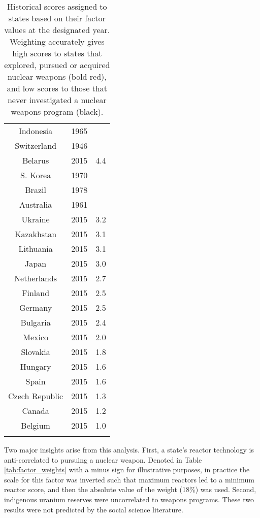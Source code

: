 \begin{table}
\begin{minipage}{.5\textwidth}
\begin{tabular}{|c|c|c|}
Indonesia & 1965 & \textbf{\color{red}{4.4}} \\
Switzerland & 1946 & \textbf{\color{red}{4.4}} \\
Belarus & 2015 & 4.4 \\
S. Korea & 1970 & \textbf{\color{red}{4.4}} \\
Brazil & 1978 & \textbf{\color{red}{4.3}} \\
Australia & 1961 & \textbf{\color{red}{3.9}} \\
Ukraine & 2015 & 3.2 \\
Kazakhstan & 2015 & 3.1 \\
Lithuania & 2015 & 3.1 \\
Japan & 2015 & 3.0 \\
Netherlands & 2015 & 2.7 \\
Finland & 2015 & 2.5 \\
Germany & 2015 & 2.5 \\
Bulgaria & 2015 & 2.4 \\
Mexico & 2015 & 2.0 \\
Slovakia & 2015 & 1.8 \\
Hungary & 2015 & 1.6 \\
Spain & 2015 & 1.6 \\
Czech Republic & 2015 & 1.3 \\
Canada & 2015 & 1.2 \\
Belgium & 2015 & 1.0 \\
        & & \\
\hline
\end{tabular}
\end{minipage}\hfill
\caption{Historical scores assigned to states based on their factor values at the designated year. Weighting accurately gives high scores to states that explored, pursued or acquired nuclear weapons (bold red), and low scores to those that never investigated a nuclear weapons program (black).}
\label{tab:state_scores}
\end{table}


Two major insights arise from this analysis. First, a state's reactor technology is anti-correlated to pursuing a nuclear weapon.  Denoted in Table \ref{tab:factor_weights} with a minus sign for illustrative purposes, in practice the scale for this factor was inverted such that maximum reactors led to a minimum reactor score, and then the absolute value of the weight (18\%) was used.  Second, indigenous uranium reserves were uncorrelated to weapons programs. These two results were not predicted by the social science literature.


